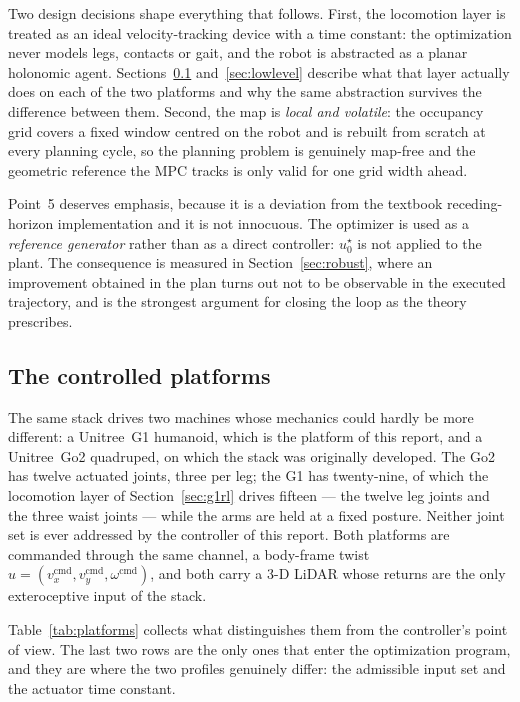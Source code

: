 \documentclass[11pt,a4paper]{article}
\begin{document}
Two design decisions shape everything that follows. First, the locomotion layer is treated as an ideal
velocity-tracking device with a time constant: the optimization never models legs, contacts or gait, and the
robot is abstracted as a planar holonomic agent. Sections~\ref{sec:platforms} and~\ref{sec:lowlevel} describe
what that layer actually does on each of the two platforms and why the same abstraction survives the
difference between them. Second, the map is \emph{local and volatile}: the occupancy grid covers a fixed
window centred on the robot and is rebuilt from scratch at every planning cycle, so the planning problem is
genuinely map-free and the geometric reference the MPC tracks is only valid for one grid width ahead.

Point~5 deserves emphasis, because it is a deviation from the textbook receding-horizon implementation and it
is not innocuous. The optimizer is used as a \emph{reference generator} rather than as a direct controller:
$u^\star_0$ is not applied to the plant. The consequence is measured in Section~\ref{sec:robust}, where an
improvement obtained in the plan turns out not to be observable in the executed trajectory, and is the
strongest argument for closing the loop as the theory prescribes.

\subsection{The controlled platforms}
\label{sec:platforms}

The same stack drives two machines whose mechanics could hardly be more different: a Unitree~G1 humanoid,
which is the platform of this report, and a Unitree~Go2 quadruped, on which the stack was originally
developed. The Go2 has twelve actuated joints, three per leg; the G1 has twenty-nine, of which the locomotion
layer of Section~\ref{sec:g1rl} drives fifteen --- the twelve leg joints and the three waist joints --- while
the arms are held at a fixed posture. Neither joint set is ever addressed by the controller of this report.
Both platforms are commanded through the same channel, a body-frame twist
$u=(v_x^{\mathrm{cmd}},v_y^{\mathrm{cmd}},\omega^{\mathrm{cmd}})$, and both carry a 3-D LiDAR whose returns
are the only exteroceptive input of the stack.

Table~\ref{tab:platforms} collects what distinguishes them from the controller's point of view. The last two
rows are the only ones that enter the optimization program, and they are where the two profiles genuinely
differ: the admissible input set and the actuator time constant.
\end{document}
